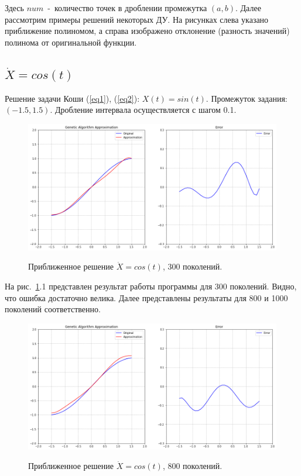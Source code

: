 \documentclass[12pt, a4paper]{article}
\begin{document}
    Здесь $num$~-~количество точек в дроблении промежутка $(a, b)$. Далее 
    рассмотрим примеры решений некоторых ДУ. На рисунках слева указано 
    приближение полиномом, а справа изображено отклонение (разность 
    значений) полинома от оригинальной функции.
    
    \subsection{$\dot{X} = cos(t)$}
    
    Решение задачи Коши (\ref{eq1}), (\ref{eq2}): $X(t) = sin(t)$. 
    Промежуток задания: $(-1.5, 1.5)$. Дробление интервала осуществляется с 
    шагом 0.1.
    
    \begin{figure}[h!]
        \center
        \includegraphics[width = 13cm]{f1_300.png}
        \label{image311}
        \caption{Приближенное решение $\dot{X} = cos(t)$, 300 поколений.}
    \end{figure}
    
    На рис.~\ref{image311}.1 представлен результат работы программы для 300 
    поколений. Видно, что ошибка достаточно велика. Далее представлены 
    результаты для 800 и 1000 поколений соответственно.
    
    \begin{figure}[h!]
        \center
        \includegraphics[width = 13cm]{f1_800.png}
        \label{image312}
        \caption{Приближенное решение $\dot{X} = cos(t)$, 800 поколений.}
    \end{figure}
    
\end{document}
